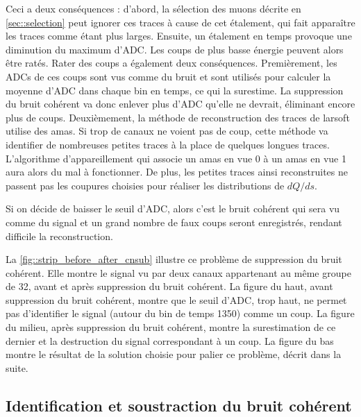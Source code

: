       Ceci a deux conséquences : d'abord, la sélection des muons décrite en \autoref{sec::selection} peut ignorer ces traces à cause de cet étalement, qui fait apparaître les traces comme étant plus larges. Ensuite, un étalement en temps provoque une diminution du maximum d'ADC. Les coups de plus basse énergie peuvent alors être ratés. Rater des coups a également deux conséquences. Premièrement, les ADCs de ces coups sont vus comme du bruit et sont utilisés pour calculer la moyenne d'ADC dans chaque bin en temps, ce qui la surestime. La suppression du bruit cohérent va donc enlever plus d'ADC qu'elle ne devrait, éliminant encore plus de coups.  Deuxièmement, la méthode de reconstruction des traces de \gls{larsoft} utilise des amas. Si trop de canaux ne voient pas de coup, cette méthode va identifier de nombreuses petites traces à la place de quelques longues traces. L'algorithme d'appareillement qui associe un amas en vue 0 à un amas en vue 1 aura alors du mal à fonctionner. De plus, les petites traces ainsi reconstruites ne passent pas les coupures choisies pour réaliser les distributions de $dQ/ds$.

      Si on décide de baisser le seuil d'ADC, alors c'est le bruit cohérent qui sera vu comme du signal et un grand nombre de faux coups seront enregistrés, rendant difficile la reconstruction.

      La \autoref{fig::strip_before_after_cnsub} illustre ce problème de suppression du bruit cohérent. Elle montre le signal vu par deux canaux appartenant au même groupe de 32, avant et après suppression du bruit cohérent. La figure du haut, avant suppression du bruit cohérent, montre que le seuil d'ADC, trop haut, ne permet pas d'identifier le signal (autour du bin de temps 1350) comme un coup.  La figure du milieu, après suppression du bruit cohérent, montre la surestimation de ce dernier et la destruction du signal correspondant à un coup. La figure du bas montre le résultat de la solution choisie pour palier ce problème, décrit dans la suite.

    \subsection{Identification et soustraction du bruit cohérent}

